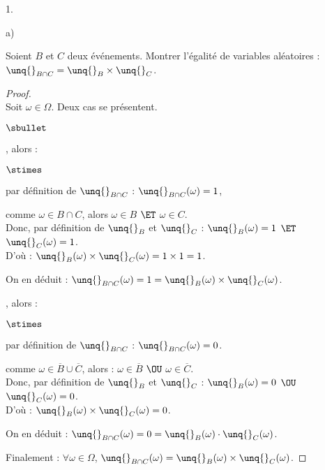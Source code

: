 \documentclass[11pt]{article}%
\begin{document}
\begin{noliste}{1.}
\begin{noliste}{a)}
    
    \item Soient $B$ et $C$ deux événements. Montrer l'égalité de 
    variables aléatoires : $\unq{}_{B \cap C} = \unq{}_B \times 
    \unq{}_C$.
    
    \begin{proof}~\\
    Soit $\omega \in \Omega$. Deux cas se présentent.
      \begin{noliste}{$\sbullet$}
	\item {}, alors :
	\begin{noliste}{$\stimes$}
	  \item par définition de $\unq{}_{B\cap C}$ : 
	  $\unq{}_{B \cap C}(\omega)=1$,
	  
	  \item comme $\omega \in B \cap C$, alors $\omega \in B$
	  $\ET$ $\omega \in C$.\\
	  Donc, par définition de $\unq{}_B$ et $\unq{}_C$ : 
	  $\unq{}_B(\omega) =1 $ $\ET$ $\unq{}_C(\omega)=1$.\\
	  D'où : $\unq{}_B(\omega) \times \unq{}_C(\omega) = 1 \times
	  1 = 1$.
	\end{noliste}
	On en déduit : $\unq{}_{B \cap C}(\omega) = 1 = 
	\unq{}_B(\omega) \times \unq{}_C(\omega)$.
	
	\item {}, alors :
	\begin{noliste}{$\stimes$}
	  \item par définition de $\unq{}_{B \cap C}$ : 
	  $\unq{}_{B \cap C}(\omega)=0$.
	  
	  \item comme $\omega \in \overline{B} \cup \overline{C}$, 
	  alors :
	  $\omega \in \overline{B}$ $\OU$ $\omega \in \overline{C}$.\\
	  Donc, par définition de $\unq{}_B$ et $\unq{}_C$ : 
	  $\unq{}_B(\omega) =0$ $\OU$ $\unq{}_C(\omega)=0$.\\
	  D'où : $\unq{}_B(\omega) \times \unq{}_C(\omega) =0$.
	\end{noliste}
	On en déduit : $\unq{}_{B\cap C}(\omega) = 0 = \unq{}_B
	(\omega) \cdot \unq{}_C(\omega)$.
      \end{noliste}
      Finalement : $\forall \omega \in \Omega$, $\unq{}_{B\cap C} 
      (\omega) = \unq{}_B(\omega) \times \unq{}_C(\omega)$.
      

\end{proof}
\end{noliste}
\end{noliste}
\end{document}
